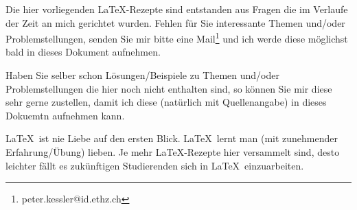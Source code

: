 
Die hier vorliegenden \LaTeX-Rezepte sind entstanden aus Fragen die im Verlaufe der Zeit an mich gerichtet wurden. Fehlen für Sie interessante Themen und/oder Problemstellungen, senden Sie mir bitte eine Mail\footnote{peter.kessler@id.ethz.ch} und ich werde diese möglichst bald in dieses Dokument aufnehmen.

Haben Sie selber schon Lösungen/Beispiele zu Themen und/oder Problemstellungen die hier noch nicht enthalten sind, so können Sie mir diese sehr gerne zustellen, damit ich diese (natürlich mit Quellenangabe) in dieses Dokuemtn aufnehmen kann.

\LaTeX\ ist nie Liebe auf den ersten Blick. \LaTeX\ lernt man (mit zunehmender Erfahrung/Übung) lieben. Je mehr \LaTeX-Rezepte hier versammelt sind, desto leichter fällt es zukünftigen Studierenden sich in \LaTeX\ einzuarbeiten.
